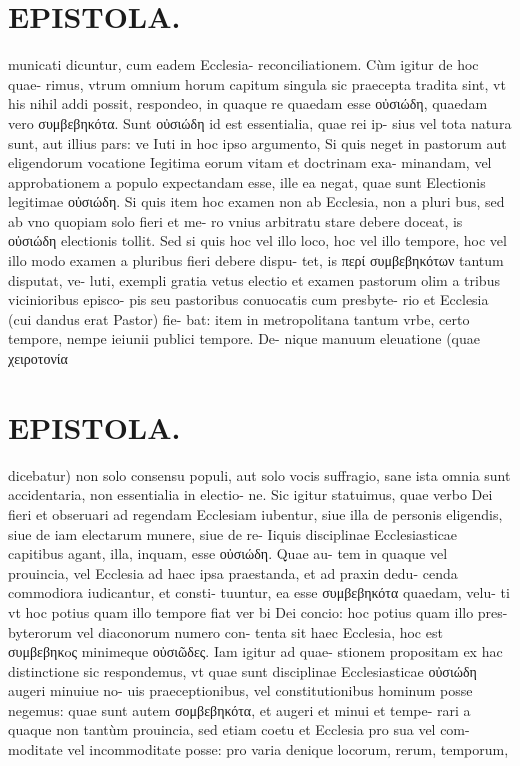 \documentclass{article}
\begin{document}
\begin{pages}
\section*{EPISTOLA. }\pstart municati dicuntur, cum eadem Ecclesia- reconciliationem. Cùm igitur de hoc quae- rimus, vtrum omnium horum capitum singula sic praecepta tradita sint, vt his nihil addi possit, respondeo, in quaque re quaedam esse οὐσιώδη, quaedam vero συμβεβηκότα. Sunt οὐσιώδη id est essentialia, quae rei ip- sius vel tota natura sunt, aut illius pars: ve Iuti in hoc ipso argumento, Si quis neget in pastorum aut eligendorum vocatione Iegitima eorum vitam et doctrinam exa- minandam, vel approbationem a populo expectandam esse, ille ea negat, quae sunt Electionis legitimae οὐσιώδη. Si quis item hoc examen non ab Ecclesia, non a pluri bus, sed ab vno quopiam solo fieri et me- ro vnius arbitratu stare debere doceat, is οὐσιώδη electionis tollit. Sed si quis hoc vel illo loco, hoc vel illo tempore, hoc vel illo modo examen a pluribus  fieri debere dispu- tet, is περί συμβεβηκότων tantum disputat, ve- luti, exempli gratia vetus electio et examen pastorum olim a tribus vicinioribus episco- pis seu pastoribus conuocatis cum presbyte- rio et Ecclesia (cui dandus erat Pastor) fie- bat: item in metropolitana tantum vrbe, certo tempore, nempe ieiunii publici tempore. De- nique manuum eleuatione (quae χειροτονία  \pend
\section*{EPISTOLA. }\pstart dicebatur) non solo consensu populi, aut solo vocis suffragio, sane ista omnia sunt accidentaria, non essentialia in electio- ne. Sic igitur statuimus, quae verbo Dei fieri et obseruari ad regendam Ecclesiam iubentur, siue illa de personis eligendis, siue de iam electarum munere, siue de re- Iiquis disciplinae Ecclesiasticae capitibus agant, illa, inquam, esse οὐσιώδη. Quae au- tem in quaque vel prouincia, vel Ecclesia ad haec ipsa praestanda, et ad praxin dedu- cenda commodiora iudicantur, et consti- tuuntur, ea esse συμβεβηκότα quaedam, velu- ti vt hoc potius quam illo tempore fiat ver bi Dei concio: hoc potius quam illo pres- byterorum vel diaconorum numero con- tenta sit haec Ecclesia, hoc est συμβεβηκoς minimeque οὐσιῶδες. Iam igitur ad quae- stionem propositam ex hac distinctione sic respondemus, vt quae sunt disciplinae Ecclesiasticae οὐσιώδη augeri minuiue no- uis praeceptionibus, vel constitutionibus hominum posse negemus: quae sunt autem σομβεβηκότα, et augeri et minui et tempe- rari a quaque non tantùm prouincia, sed etiam coetu et Ecclesia pro sua vel com- moditate vel incommoditate posse: pro varia denique locorum, rerum, temporum,  \pend

\end{pages}
\end{document}
